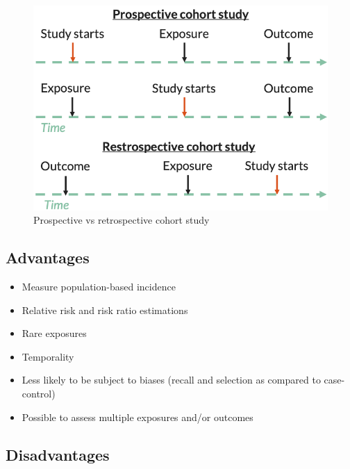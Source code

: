 \documentclass[
]{book}
\providecommand{\tightlist}{%
  \setlength{\itemsep}{0pt}\setlength{\parskip}{0pt}}
\begin{document}
\begin{figure}

{\centering \includegraphics[width=1\linewidth]{img/study_design/ret_vs_pros_cohort} 

}

\caption{Prospective vs retrospective cohort study}\label{fig:unnamed-chunk-7}
\end{figure}

\hypertarget{advantages-2}{%
\subsection{Advantages}\label{advantages-2}}

\begin{itemize}
\tightlist
\item
  Measure population-based incidence
\item
  Relative risk and risk ratio estimations
\item
  Rare exposures
\item
  Temporality
\item
  Less likely to be subject to biases (recall and selection as compared to case-control)
\item
  Possible to assess multiple exposures and/or outcomes
\end{itemize}

\hypertarget{disadvantages-1}{%
\subsection{Disadvantages}\label{disadvantages-1}}
\end{document}
